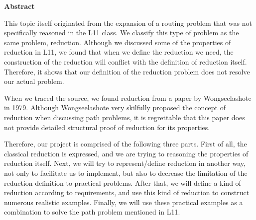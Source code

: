 \newpage
{\Huge \bf Abstract}
\vspace{24pt} 

This topic itself originated from the expansion of a routing problem that was not specifically reasoned in the L11 class. We classify this type of problem as the same problem, reduction. Although we discussed some of the properties of reduction in L11, we found that when we define the reduction we need, the construction of the reduction will conflict with the definition of reduction itself. Therefore, it shows that our definition of the reduction problem does not resolve our actual problem.

When we traced the source, we found reduction from a paper by Wongseelashote in 1979. Although Wongseelashote very skilfully proposed the concept of reduction when discussing path problems, it is regrettable that this paper does not provide detailed structural proof of reduction for its properties.

Therefore, our project is comprised of the following three parts. First of all, the classical reduction is expressed, and we are trying to reasoning the properties of reduction itself. Next, we will try to represent/define reduction in another way, not only to facilitate us to implement, but also to decrease the limitation of the reduction definition to practical problems. After that, we will define a kind of reduction according to requirements, and use this kind of reduction to construct numerous realistic examples. Finally, we will use these practical examples as a combination to solve the path problem mentioned in L11.

\newpage
\vspace*{\fill}
